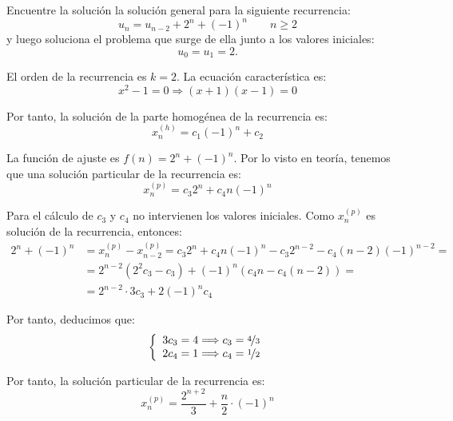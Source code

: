\begin{ejercicio}
    Encuentre la solución la solución general para la siguiente recurrencia:
    \begin{equation*}
        u_n = u_{n-2} + 2^n + (-1)^n \qquad n\geq 2
    \end{equation*}
    y luego soluciona el problema que surge de ella junto a los valores iniciales: $$u_0 = u_1 = 2.$$

    El orden de la recurrencia es $k=2$. La ecuación característica es:
    \begin{equation*}
        x^2 - 1 = 0 \Longrightarrow (x+1)(x-1) = 0
    \end{equation*}

    Por tanto, la solución de la parte homogénea de la recurrencia es:
    \begin{equation*}
        x_n^{(h)} = c_1(-1)^n + c_2
    \end{equation*}

    La función de ajuste es $f(n) = 2^n + (-1)^n$. Por lo visto en teoría, tenemos que
    una solución particular de la recurrencia es:
    \begin{equation*}
        x_n^{(p)} = c_3 2^n + c_4n(-1)^n
    \end{equation*}

    Para el cálculo de $c_3$ y $c_4$ no intervienen los valores iniciales.
    Como $x_n^{(p)}$ es solución de la recurrencia, entonces:
    \begin{align*}
        2^n + (-1)^n &= x_{n}^{(p)} - x_{n-2}^{(p)}
        = c_3 2^n + c_4n(-1)^n - c_3 2^{n-2} - c_4(n-2)(-1)^{n-2} =\\
        &= 2^{n-2}(2^2c_3-c_3) + (-1)^{n}(c_4n - c_4(n-2)) =\\
        &= 2^{n-2}\cdot 3c_3 + 2(-1)^n c_4
    \end{align*}

    Por tanto, deducimos que:
    \begin{equation*}
        \left\{\begin{array}{l}
            3c_3 = 4 \Longrightarrow c_3 = \nicefrac{4}{3} \\
            2c_4 = 1 \Longrightarrow c_4 = \nicefrac{1}{2}
        \end{array}\right.
    \end{equation*}

    Por tanto, la solución particular de la recurrencia es:
    \begin{equation*}
        x_n^{(p)} = \frac{2^{n+2}}{3} + \frac{n}{2}\cdot (-1)^n
    \end{equation*}


\end{ejercicio}
